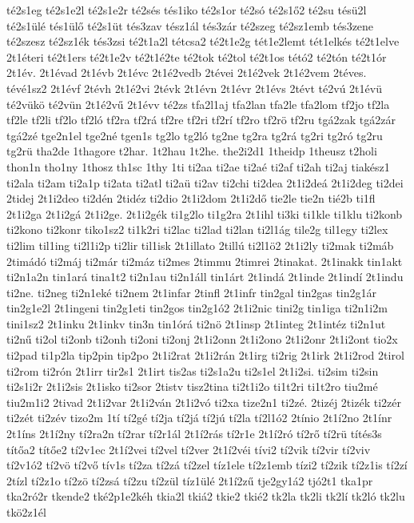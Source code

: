 {té2s1eg
té2s1e2l
té2s1e2r
té2sés
tés1iko
té2s1or
té2só
té2s1ő2
té2su
tésü2l
té2s1ülé
tés1ülő
té2s1üt
tés3zav
tész1ál
tés3zár
té2szeg
té2sz1emb
tés3zene
té2szesz
té2sz1ék
tés3zsi
té2t1a2l
tétcsa2
té2t1e2g
tét1e2lemt
tét1elkés
té2t1elve
2t1éteri
té2t1ers
té2t1e2v
té2t1é2te
té2tok
té2tol
té2t1os
tétó2
té2tón
té2t1ór
2t1év.
2t1évad
2t1évb
2t1évc
2t1é2vedb
2tévei
2t1é2vek
2t1é2vem
2téves.
tévé1sz2
2t1évf
2tévh
2t1é2vi
2tévk
2t1évn
2t1évr
2t1évs
2tévt
té2vú
2t1évü
té2vükö
té2vün
2t1é2vű
2t1évv
té2zs
tfa2l1aj
tfa2lan
tfa2le
tfa2lom
tf2jo
tf2la
tf2le
tf2li
tf2lo
tf2ló
tf2ra
tf2rá
tf2re
tf2ri
tf2rí
tf2ro
tf2rö
tf2ru
tgá2zak
tgá2zár
tgá2zé
tge2n1el
tge2né
tgen1s
tg2lo
tg2ló
tg2ne
tg2ra
tg2rá
tg2ri
tg2ró
tg2ru
tg2rü
tha2de
1thagore
t2har.
1t2hau
1t2he.
the2i2d1
1theidp
1theusz
t2holi
thon1n
tho1ny
1thosz
th1sc
1thy
1ti
ti2aa
ti2ae
ti2aé
ti2af
ti2ah
ti2aj
tiakész1
ti2ala
ti2am
ti2a1p
ti2ata
ti2atl
ti2aü
ti2av
ti2chi
ti2dea
2t1i2deá
2t1i2deg
ti2dei
2tidej
2t1i2deo
ti2dén
2tidéz
ti2dio
2t1i2dom
2t1i2dő
tie2le
tie2n
tié2b
ti1fl
2t1i2ga
2t1i2gá
2t1i2ge.
2t1i2gék
ti1g2lo
ti1g2ra
2t1ihl
ti3ki
ti1kle
ti1klu
ti2konb
ti2kono
ti2konr
tiko1sz2
ti1k2ri
ti2lac
ti2lad
ti2lan
ti2l1ág
tile2g
til1egy
ti2lex
ti2lim
til1ing
ti2l1i2p
ti2lir
til1isk
2t1illato
2tillú
ti2l1ö2
2t1i2ly
ti2mak
ti2máb
2timádó
ti2máj
ti2már
ti2máz
ti2mes
2timmu
2timrei
2tinakat.
2t1inakk
tin1akt
ti2n1a2n
tin1ará
tina1t2
ti2n1au
ti2n1áll
tin1árt
2t1indá
2t1inde
2t1indí
2t1indu
ti2ne.
ti2neg
ti2n1eké
ti2nem
2t1infar
2tinfl
2t1infr
tin2gal
tin2gas
tin2g1ár
tin2g1e2l
2t1ingeni
tin2g1eti
tin2gos
tin2g1ó2
2t1i2nic
tini2g
tin1iga
ti2n1i2m
tini1sz2
2t1inku
2t1inkv
tin3n
tin1órá
ti2nö
2t1insp
2t1integ
2t1intéz
ti2n1ut
ti2nű
ti2ol
ti2onb
ti2onh
ti2oni
ti2onj
2t1i2onn
2t1i2ono
2t1i2onr
2t1i2ont
tio2x
ti2pad
ti1p2la
tip2pin
tip2po
2t1i2rat
2t1i2rán
2t1irg
ti2rig
2t1irk
2t1i2rod
2tirol
ti2rom
ti2rón
2t1irr
tir2s1
2t1irt
tis2as
ti2s1a2u
ti2s1el
2t1i2si.
ti2sim
ti2sin
ti2s1i2r
2t1i2sis
2t1isko
ti2sor
2tistv
tisz2tina
ti2t1i2o
ti1t2ri
ti1t2ro
tiu2mé
tiu2m1i2
2tivad
2t1i2var
2t1i2ván
2t1i2vó
ti2xa
tize2n1
ti2zé.
2tizéj
2tizék
ti2zér
ti2zét
ti2zév
tizo2m
1tí
tí2gé
tí2ja
tí2já
tí2jú
tí2la
tí2l1ó2
2tínio
2t1í2no
2t1ínr
2t1íns
2t1í2ny
tí2ra2n
tí2rar
tí2r1ál
2t1í2rás
tí2r1e
2t1í2ró
tí2rő
tí2rü
títés3s
títőa2
títőe2
tí2v1ec
2t1í2vei
tí2vel
tí2ver
2t1í2véi
tívi2
tí2vik
tí2vir
tí2viv
tí2v1ó2
tí2vö
tí2vő
tív1s
tí2za
tí2zá
tí2zel
tíz1ele
tí2z1emb
tízi2
tí2zik
tí2z1is
tí2zí
2tízl
tí2z1o
tí2zö
tí2zsá
tí2zu
tí2zül
tíz1ülé
2t1í2zű
tje2gy1á2
tjó2t1
tka1pr
tka2ró2r
tkende2
tké2p1e2kéh
tkia2l
tkiá2
tkie2
tkié2
tk2la
tk2li
tk2lí
tk2ló
tk2lu
tkö2z1él
}
